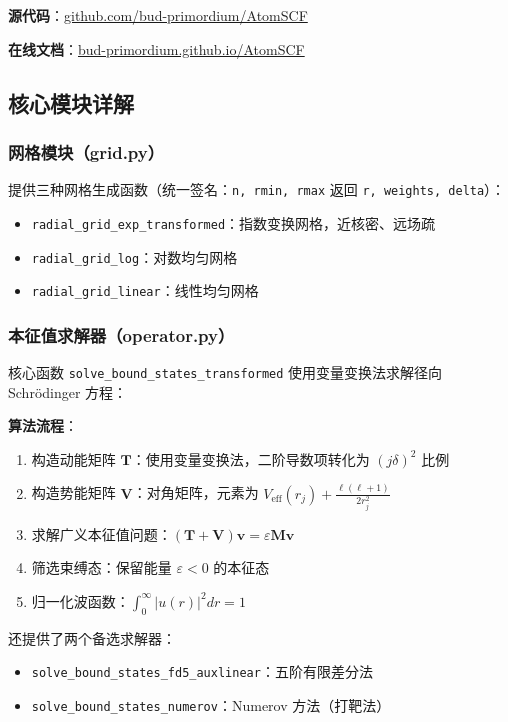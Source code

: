 \documentclass[12pt,a4paper]{article}
\begin{document}
\textbf{源代码}：\href{https://github.com/bud-primordium/AtomSCF}{github.com/bud-primordium/AtomSCF}

\textbf{在线文档}：\href{https://bud-primordium.github.io/AtomSCF/}{bud-primordium.github.io/AtomSCF}

\subsection{核心模块详解}

\subsubsection{网格模块（grid.py）}

提供三种网格生成函数（统一签名：\texttt{n, rmin, rmax} 返回 \texttt{r, weights, delta}）：
\begin{itemize}
    \item \texttt{radial\_grid\_exp\_transformed}：指数变换网格，近核密、远场疏
    \item \texttt{radial\_grid\_log}：对数均匀网格
    \item \texttt{radial\_grid\_linear}：线性均匀网格
\end{itemize}

\subsubsection{本征值求解器（operator.py）}

核心函数 \texttt{solve\_bound\_states\_transformed} 使用变量变换法求解径向 Schrödinger 方程：

\textbf{算法流程}：
\begin{enumerate}
    \item 构造动能矩阵 $\mathbf{T}$：使用变量变换法，二阶导数项转化为 $(j\delta)^2$ 比例
    \item 构造势能矩阵 $\mathbf{V}$：对角矩阵，元素为 $V_{\text{eff}}(r_j) + \frac{\ell(\ell+1)}{2r_j^2}$
    \item 求解广义本征值问题：$(\mathbf{T} + \mathbf{V}) \mathbf{v} = \varepsilon \mathbf{M} \mathbf{v}$
    \item 筛选束缚态：保留能量 $\varepsilon < 0$ 的本征态
    \item 归一化波函数：$\int_0^\infty |u(r)|^2 dr = 1$
\end{enumerate}

还提供了两个备选求解器：
\begin{itemize}
    \item \texttt{solve\_bound\_states\_fd5\_auxlinear}：五阶有限差分法
    \item \texttt{solve\_bound\_states\_numerov}：Numerov 方法（打靶法）
\end{itemize}
\end{document}
